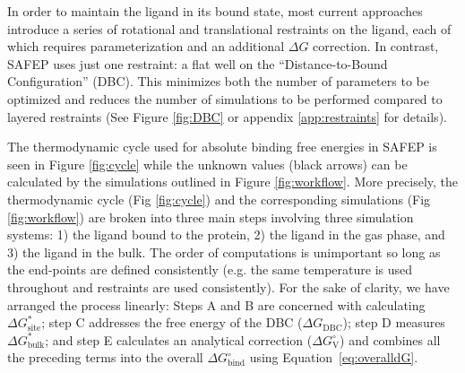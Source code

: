 \documentclass[9pt,tutorial]{Styling/livecoms}
\begin{document}
In order to maintain the ligand in its bound state, most current approaches introduce a series of rotational and translational restraints on the ligand, each of which requires parameterization and an additional $\Delta G$ correction.
In contrast, SAFEP uses just one restraint: a flat well on the ``Distance-to-Bound Configuration'' (DBC). This minimizes both the number of parameters to be optimized and reduces the number of simulations to be performed compared to layered restraints (See Figure \ref{fig:DBC} or appendix \ref{app:restraints} for details).

The thermodynamic cycle used for absolute binding free energies in SAFEP is seen in Figure \ref{fig:cycle} while the unknown values (black arrows) can be calculated by the simulations outlined in Figure \ref{fig:workflow}.
More precisely, the thermodynamic cycle (Fig \ref{fig:cycle}) and the corresponding simulations (Fig \ref{fig:workflow}) are broken into three main steps involving three simulation systems: 1) the ligand bound to the protein, 2) the ligand in the gas phase, and 3) the ligand in the bulk. 
The order of computations is unimportant so long as the end-points are defined consistently (e.g. the same temperature is used throughout and restraints are used consistently). 
For the sake of clarity, we have arranged the process linearly: Steps A and B are concerned with calculating $\Delta G^*_\mathrm{site}$; step C addresses the free energy of the DBC ($\Delta G_\mathrm{DBC}$); step D measures $\Delta G^*_\mathrm{bulk}$; and step E calculates an analytical correction ($\Delta G^\circ_\mathrm{V}$) and combines all the preceding terms into the overall $\Delta G^\circ_\mathrm{bind}$ using Equation~\ref{eq:overalldG}.


\end{document}
